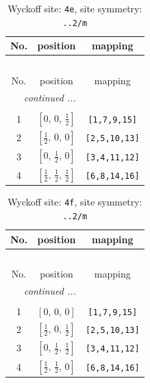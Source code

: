 \documentclass[fleqn,8pt]{jsarticle}
\begin{document}
\renewcommand{\arraystretch}{1.2}
\begin{longtable}{ccc}
\caption{Wyckoff site: {\tt 4e}, site symmetry: {\tt ..2/m}}
 \\
 \hline \hline
No. & position & mapping \\ \hline \endfirsthead

\multicolumn{2}{l}{\tablename\ \thetable{}} \\
 \hline \hline
No. & position & mapping \\ \hline \endhead

 \hline \hline
\multicolumn{2}{r}{\footnotesize\it continued ...} \\ \endfoot

 \hline \hline
\multicolumn{2}{r}{} \\ \endlastfoot

1 & $\left[ 0,\, 0,\, \frac{1}{2} \right]$ & {\tt [1,7,9,15]} \\ \hline
2 & $\left[ \frac{1}{2},\, 0,\, 0 \right]$ & {\tt [2,5,10,13]} \\ \hline
3 & $\left[ 0,\, \frac{1}{2},\, 0 \right]$ & {\tt [3,4,11,12]} \\ \hline
4 & $\left[ \frac{1}{2},\, \frac{1}{2},\, \frac{1}{2} \right]$ & {\tt [6,8,14,16]} \\
\end{longtable}
\renewcommand{\arraystretch}{1.2}
\begin{longtable}{ccc}
\caption{Wyckoff site: {\tt 4f}, site symmetry: {\tt ..2/m}}
 \\
 \hline \hline
No. & position & mapping \\ \hline \endfirsthead

\multicolumn{2}{l}{\tablename\ \thetable{}} \\
 \hline \hline
No. & position & mapping \\ \hline \endhead

 \hline \hline
\multicolumn{2}{r}{\footnotesize\it continued ...} \\ \endfoot

 \hline \hline
\multicolumn{2}{r}{} \\ \endlastfoot

1 & $\left[ 0,\, 0,\, 0 \right]$ & {\tt [1,7,9,15]} \\ \hline
2 & $\left[ \frac{1}{2},\, 0,\, \frac{1}{2} \right]$ & {\tt [2,5,10,13]} \\ \hline
3 & $\left[ 0,\, \frac{1}{2},\, \frac{1}{2} \right]$ & {\tt [3,4,11,12]} \\ \hline
4 & $\left[ \frac{1}{2},\, \frac{1}{2},\, 0 \right]$ & {\tt [6,8,14,16]} \\
\end{longtable}
\end{document}
